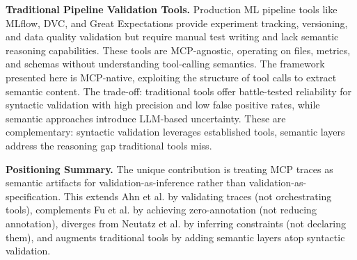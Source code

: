 \textbf{Traditional Pipeline Validation Tools.} Production ML pipeline tools like MLflow, DVC, and Great Expectations provide experiment tracking, versioning, and data quality validation but require manual test writing and lack semantic reasoning capabilities. These tools are MCP-agnostic, operating on files, metrics, and schemas without understanding tool-calling semantics. The framework presented here is MCP-native, exploiting the structure of tool calls to extract semantic content. The trade-off: traditional tools offer battle-tested reliability for syntactic validation with high precision and low false positive rates, while semantic approaches introduce LLM-based uncertainty. These are complementary: syntactic validation leverages established tools, semantic layers address the reasoning gap traditional tools miss.

\textbf{Positioning Summary.} The unique contribution is treating MCP traces as semantic artifacts for validation-as-inference rather than validation-as-specification. This extends Ahn et al. by validating traces (not orchestrating tools), complements Fu et al. by achieving zero-annotation (not reducing annotation), diverges from Neutatz et al. by inferring constraints (not declaring them), and augments traditional tools by adding semantic layers atop syntactic validation.
